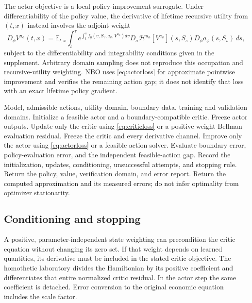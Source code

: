 \documentclass[ecta,nameyear,draft]{econsocart}
\theoremstyle{definition}
\theoremstyle{remark}
\newcommand{\E}{\mathbb E}
\newcommand{\HH}{\mathcal H}
\begin{document}
The actor objective is a local policy-improvement surrogate. Under differentiability of the policy value, the derivative of lifetime recursive utility from $(t,x)$ instead involves the adjoint weight
\begin{equation}\label{eq:gradient}
 D_\phi V^{a_\phi}(t,x)=\E_{t,x}\int_t^\tau
 e^{\int_t^s f_y(v,S_v,a_v,V^{a_\phi})dv}
 D_a\HH^{a_\phi}[V^{a_\phi}](s,S_s)D_\phi a_\phi(s,S_s)\,ds,
\end{equation}
subject to the differentiability and integrability conditions given in the supplement. Arbitrary domain sampling does not reproduce this occupation and recursive-utility weighting. NBO uses \eqref{eq:actorloss} for approximate pointwise improvement and verifies the remaining action gap; it does not identify that loss with an exact lifetime policy gradient.

\begin{algorithm}[t]
\caption{NBO evaluation, improvement, and acceptance}\label{alg:nbo}
\begin{algorithmic}[1]
\Require Model, admissible actions, utility domain, boundary data, training and validation domains.
\State Initialize a feasible actor and a boundary-compatible critic.
 \State Freeze actor outputs. Update only the critic using \eqref{eq:criticloss} or a positive-weight Bellman evaluation residual.
 \State Freeze the critic and every derivative channel. Improve only the actor using \eqref{eq:actorloss} or a feasible action solver.
 \State Evaluate boundary error, policy-evaluation error, and the independent feasible-action gap.
 \State Record the initialization, updates, conditioning, unsuccessful attempts, and stopping rule.
  \State Return the policy, value, verification domain, and error report.
 \EndIf
\EndFor
\State Return the computed approximation and its measured errors; do not infer optimality from optimizer stationarity.
\end{algorithmic}
\end{algorithm}

\subsection{Conditioning and stopping}
A positive, parameter-independent state weighting can precondition the critic equation without changing its zero set. If that weight depends on learned quantities, its derivative must be included in the stated critic objective. The homothetic laboratory divides the Hamiltonian by its positive coefficient and differentiates that entire normalized critic residual. In the actor step the same coefficient is detached. Error conversion to the original economic equation includes the scale factor.
\end{document}

